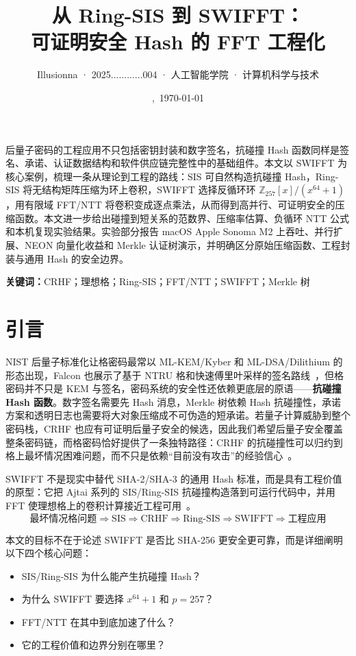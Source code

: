 \documentclass{article}
\title{\bfseries\color[HTML]{16324F}从 Ring-SIS 到 SWIFFT：\\可证明安全 Hash 的 FFT 工程化}
\author{Illusionna · 2025............004 · 人工智能学院 · 计算机科学与技术}
\date{\currenttime,\ \today}
\renewenvironment{abstract}{
    \begin{center}
        {\Large\bfseries \abstractname}
    \end{center}
    \quotation
}{\endquotation}
\begin{document}
\maketitle

\begin{abstract}
    后量子密码的工程应用不只包括密钥封装和数字签名，抗碰撞 Hash 函数同样是签名、承诺、认证数据结构和软件供应链完整性中的基础组件。本文以 SWIFFT 为核心案例，梳理一条从理论到工程的路线：SIS 可自然构造抗碰撞 Hash，Ring-SIS 将无结构矩阵压缩为环上卷积，SWIFFT 选择反循环环 $\mathbb{Z}_{257}[x]/(x^{64}+1)$，用有限域 FFT/NTT 将卷积变成逐点乘法，从而得到高并行、可证明安全的压缩函数。本文进一步给出碰撞到短关系的范数界、压缩率估算、负循环 NTT 公式和本机复现实验结果。实验部分报告 macOS Apple Sonoma M2 上吞吐、并行扩展、NEON 向量化收益和 Merkle 认证树演示，并明确区分原始压缩函数、工程封装与通用 Hash 的安全边界。
\end{abstract}

\noindent\textbf{关键词：}CRHF；理想格；Ring-SIS；FFT/NTT；SWIFFT；Merkle 树

\tableofcontents



\section{引言}
NIST 后量子标准化让格密码最常以 ML-KEM/Kyber 和 ML-DSA/Dilithium 的形态出现，Falcon 也展示了基于 NTRU 格和快速傅里叶采样的签名路线~\cite{Kyber,Dilithium,Falcon}，但格密码并不只是 KEM 与签名，密码系统的安全性还依赖更底层的原语——\textbf{抗碰撞 Hash 函数}。数字签名需要先 Hash 消息，Merkle 树依赖 Hash 抗碰撞性，承诺方案和透明日志也需要将大对象压缩成不可伪造的短承诺。若量子计算威胁到整个密码栈，CRHF 也应有可证明后量子安全的候选，因此我们希望后量子安全覆盖整条密码链，而格密码恰好提供了一条独特路径：CRHF 的抗碰撞性可以归约到格上最坏情况困难问题，而不只是依赖“目前没有攻击”的经验信心~\cite{Ajtai96,LM06,PR06}。

SWIFFT 不是现实中替代 SHA-2/SHA-3 的通用 Hash 标准，而是具有工程价值的原型：它把 Ajtai 系列的 SIS/Ring-SIS 抗碰撞构造落到可运行代码中，并用 FFT 使理想格上的卷积计算接近工程可用~\cite{SWIFFT08,Repo}。
\[ \text{最坏情况格问题}\Longrightarrow\text{SIS}\Longrightarrow\text{CRHF}\Longrightarrow\text{Ring-SIS}\Longrightarrow\text{SWIFFT}\Longrightarrow\text{工程应用} \]

本文的目标不在于论述 SWIFFT 是否比 SHA-256 更安全更可靠，而是详细阐明以下四个核心问题：

\begin{itemize}
    \item[$\divideontimes$] SIS/Ring-SIS 为什么能产生抗碰撞 Hash？
    \item[$\divideontimes$] 为什么 SWIFFT 要选择 $x^{64}+1$ 和 $p=257$？
    \item[$\divideontimes$] FFT/NTT 在其中到底加速了什么？
    \item[$\divideontimes$] 它的工程价值和边界分别在哪里？
\end{itemize}
\end{document}

